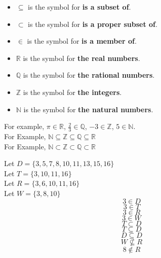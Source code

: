 \documentclass{ximera}
\begin{document}
\begin{notation}
\begin{itemize}
\item $\subseteq$ is the symbol for \textbf{is a subset of}.
\item $\subset$ is the symbol for \textbf{is a proper subset of}.
\item $\in$ is the symbol for \textbf{is a member of}.
\item $\mathbb{R}$ is the symbol for \textbf{the real numbers}.
\item $\mathbb{Q}$ is the symbol for \textbf{the rational numbers}.
\item $\mathbb{Z}$ is the symbol for \textbf{the integers}.
\item $\mathbb{N}$ is the symbol for \textbf{the natural numbers}.
\end{itemize}


For example, $\pi \in \mathbb{R}$, $\tfrac{2}{3} \in \mathbb{Q}$, $-3 \in \mathbb{Z}$, $5 \in \mathbb{N}$. \\

For Example,  $\mathbb{N} \subseteq \mathbb{Z} \subseteq \mathbb{Q} \subseteq \mathbb{R}$ \\

For Example,  $\mathbb{N} \subset \mathbb{Z} \subset \mathbb{Q} \subset \mathbb{R}$


\end{notation}



\begin{example}


Let $D = \{ 3, 5, 7, 8, 10, 11, 13, 15, 16 \}$  \\
Let $T = \{ 3, 10, 11, 16 \}$  \\
Let $R = \{ 3, 6, 10, 11, 16 \}$   \\
Let $W = \{ 3, 8, 10 \}$   \\


\[   3 \in D  \]
\[   3 \in T  \]
\[   3 \in R  \]
\[   3 \in W  \]
\[   T \subset D \]
\[   T \subseteq D \]
\[   D \subseteq D \]
\[   W \nsubseteq R \]
\[   8 \notin R  \]


\end{example}
\end{document}
